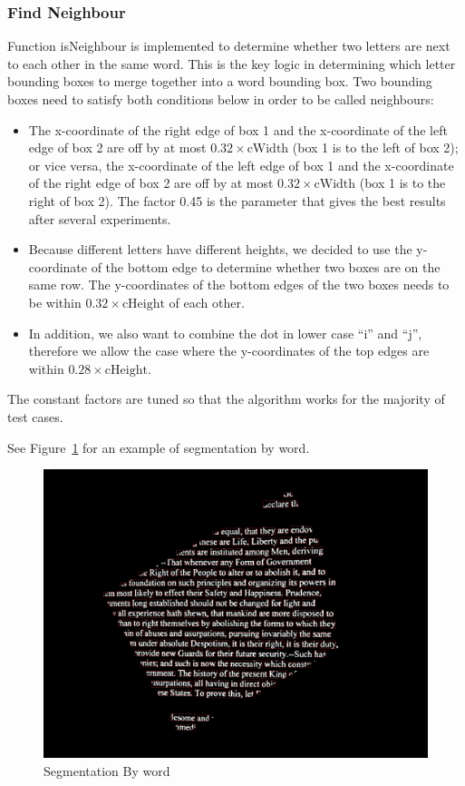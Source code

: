 \documentclass[conference]{IEEEtran}
\begin{document}
\subsubsection{Find Neighbour}
Function isNeighbour is implemented to determine whether two letters are next to each other in the same word.  This is the key logic in determining which letter bounding boxes to merge together into a word bounding box.  Two bounding boxes need to satisfy both conditions below in order to be called neighbours:
\begin{itemize}
\item The x-coordinate of the right edge of box 1 and the x-coordinate of the left edge of box 2 are off by at most $0.32 \times \mbox{cWidth}$ (box 1 is to the left of box 2); or vice versa, the x-coordinate of the left edge of box 1 and the x-coordinate of the right edge of box 2 are off by at most $0.32 \times \mbox{cWidth}$ (box 1 is to the right of box 2).  The factor 0.45 is the parameter that gives the best results after several experiments.
\item  Because different letters have different heights, we decided to use the y-coordinate of the bottom edge to determine whether two boxes are on the same row.  The y-coordinates of the bottom edges of the two boxes needs to be within $0.32 \times \mbox{cHeight}$ of each other.
\item  In addition, we also want to combine the dot in lower case ``i'' and ``j'', therefore we allow the case where the y-coordinates of the top edges are within $0.28 \times \mbox{cHeight}$.
\end{itemize}
The constant factors are tuned so that the algorithm works for the majority of test cases.

See Figure~\ref{wordbbox} for an example of segmentation by word.

\begin{figure}
\center
\includegraphics[scale=0.10]{word_with_bounding_box.jpg}
\caption{Segmentation By word}
\label{wordbbox}
\end{figure}
\end{document}
